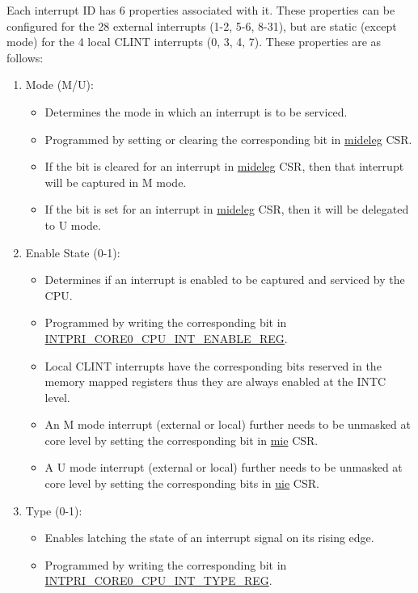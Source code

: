 \documentclass[main\_\_EN.tex]{subfiles}
\begin{document}
Each interrupt ID has 6 properties associated with it. These properties can be configured for the 28 external interrupts (1-2, 5-6, 8-31), but are static (except mode) for the 4 local CLINT interrupts (0, 3, 4, 7). These properties are as follows:

\begin{enumerate}
    \item Mode (M/U):
    \begin{itemize}
        \item Determines the mode in which an interrupt is to be serviced.
        \item Programmed by setting or clearing the corresponding bit in \hyperref[regdesc:MIDELEG]{mideleg} CSR.
        \item If the bit is cleared for an interrupt in \hyperref[regdesc:MIDELEG]{mideleg} CSR, then that interrupt will be captured in M mode.
        \item If the bit is set for an interrupt in \hyperref[regdesc:MIDELEG]{mideleg} CSR, then it will be delegated to U mode.
    \end{itemize}
    \item Enable State (0-1):
    \begin{itemize}
        \item Determines if an interrupt is enabled to be captured and serviced by the CPU.
        \item Programmed by writing the corresponding bit in \hyperref[regdesc:INTPRICORE0CPUINTENABLEREG]{INTPRI\_CORE0\_CPU\_INT\_ENABLE\_REG}.
        \item Local CLINT interrupts have the corresponding bits reserved in the memory mapped registers thus they are always enabled at the INTC level.
        \item An M mode interrupt (external or local) further needs to be unmasked at core level by setting the corresponding bit in \hyperref[regdesc:MIE]{mie} CSR.
        \item A U mode interrupt (external or local) further needs to be unmasked at core level by setting the corresponding bits in \hyperref[regdesc:UIE]{uie} CSR.
    \end{itemize}
    \item Type (0-1):
    \begin{itemize}
        \item Enables latching the state of an interrupt signal on its rising edge.
        \item Programmed by writing the corresponding bit in \hyperref[regdesc:INTPRICORE0CPUINTTYPEREG]{INTPRI\_CORE0\_CPU\_INT\_TYPE\_REG}.

\end{itemize}
\end{enumerate}
\end{document}
